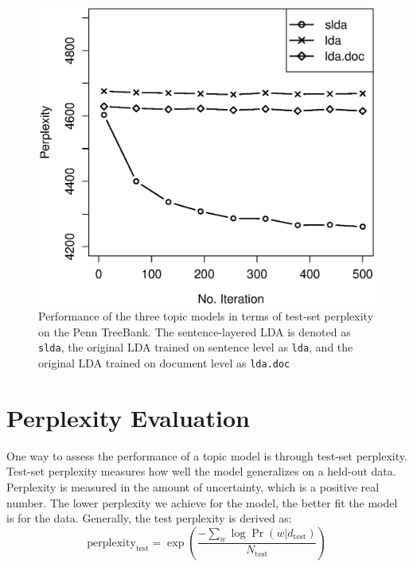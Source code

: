 \begin{figure}[!ht]
  \centering
  \includegraphics[width=\columnwidth]{ppl.eps}
  \caption{Performance of the three topic models in terms of test-set
  perplexity on the Penn TreeBank.  The sentence-layered LDA is denoted as {\tt
  slda}, the original LDA trained on sentence level as {\tt lda}, and the
  original LDA trained on document level as {\tt lda.doc} }
  \label{f:perplexity}
\end{figure}

\section{Perplexity Evaluation} \label{s:perplexity-evaluation}

One way to assess the performance of a topic model is through test-set
perplexity.  Test-set perplexity measures how well the model generalizes on
a held-out data.  Perplexity is measured in the amount of uncertainty, which is
a positive real number.  The lower perplexity we achieve for the model, the better
fit the model is for the data.  Generally, the test perplexity is derived as:
\[ \mathrm{perplexity_{test}} = \exp(\frac{- \sum_w \log \Pr(w|d_\mathrm{test})}{N_\mathrm{test}}) \]

